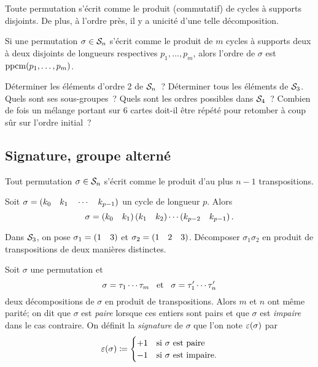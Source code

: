 \documentclass{magnolia}
\begin{document}
\begin{theoreme}
Toute permutation s'écrit comme le produit (commutatif) de cycles à supports
disjoints. De plus, à l'ordre près, il y a unicité d'une telle décomposition.
\end{theoreme}

\begin{remarqueUnique}
\remarque Si une permutation $\sigma\in\mathcal{S}_{n}$ s'écrit comme le produit
  de $m$ cycles à supports deux à deux disjoints de longueurs respectives $p_1,\ldots,p_m$, alors l'ordre de
  $\sigma$ est $\operatorname{ppcm}(p_1,\ldots,p_m)$.  
\end{remarqueUnique}

\begin{exos}
\exo Déterminer les éléments d'ordre 2 de $\mathcal{S}_{n}$~?
\exo Déterminer tous les éléments de $\mathcal{S}_{3}$. Quels sont ses
  sous-groupes~?
\exo Quels sont les ordres possibles dans $\mathcal{S}_{4}$~?
\exo Combien de fois un mélange portant sur 6 cartes doit-il être répété
  pour retomber à coup sûr sur l'ordre initial~?
\end{exos}

\subsection{Signature, groupe alterné}

\begin{proposition}
Tout permutation $\sigma\in\mathcal{S}_{n}$ s'écrit comme le produit d'au plus
$n-1$ transpositions.
\end{proposition}

\begin{remarqueUnique}
\remarque Soit $\sigma=\left(k_0 \quad k_1 \quad \cdots \quad k_{p-1}\right)$ un cycle de
  longueur $p$. Alors
  \[\sigma=\left(k_0 \quad k_1\right)\left(k_1 \quad k_2\right)\cdots\left(k_{p-2} \quad k_{p-1}\right).\]
\end{remarqueUnique}

\begin{exoUnique}
\exo Dans $\mathcal{S}_{3}$, on pose $\sigma_1=\left(1\quad 3\right)$ et
  $\sigma_2=\left(1\quad 2\quad 3\right)$. Décomposer $\sigma_1 \sigma_2$ en
  produit de transpositions de deux manières distinctes.
\end{exoUnique}

\begin{definition}
Soit $\sigma$ une permutation et
\[\sigma=\tau_1\cdots\tau_{m} \quad\!\text{et}\quad\! \sigma=\tau_1'\cdots\tau_{n}'\]
deux décompositions de $\sigma$ en produit de transpositions.
Alors $m$ et $n$ ont même parité; on dit que $\sigma$ est \emph{paire} lorsque ces entiers
sont pairs et que $\sigma$ est \emph{impaire} dans le cas contraire.
On définit la \emph{signature} de $\sigma$ que l'on note $\signat{\sigma}$ par
\[\signat{\sigma}\defeq
  \begin{cases}
  +1 & \text{si $\sigma$ est paire}\\
  -1 & \text{si $\sigma$ est impaire.}
  \end{cases}\]
\end{definition}
\end{document}
